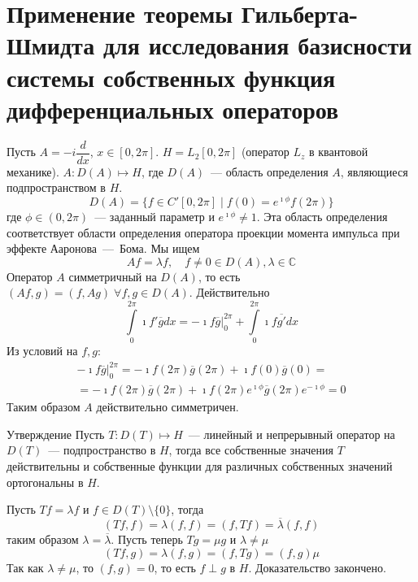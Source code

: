 \documentclass[14pt]{extarticle}
\begin{document}
\section*{Применение теоремы Гильберта-Шмидта для исследования базисности
системы собственных функция дифференциальных операторов}
\begin{Prim}
    Пусть $A = -i\dfrac{d}{dx}$, $x \in [0, 2\pi]$.
    $H = L_2[0, 2\pi]$ (оператор $L_z$ в квантовой механике).
    $A : D(A) \mapsto H$, где $D(A)$~--- область определения $A$, являющиеся
    подпространством в $H$.
    $$
    D(A) = \{f \in C'[0,2\pi] \mid f(0) = e^{\imath \phi}f(2\pi)\}
    $$
    где $\phi \in (0, 2\pi)$~--- заданный параметр и $e^{\imath \phi} \neq 1$.
    Эта область определения соответствует области определения оператора проекции
    момента импульса при эффекте Ааронова~---~Бома.
    Мы ищем
    $$
    Af = \lambda f,\quad f \neq 0\in D(A), \lambda \in \mathbb C
    $$
    Оператор $A$ симметричный на $D(A)$, то есть $(Af, g) = (f, Ag)\;\forall f,g \in D(A)$.
    Действительно
    $$
    \int\limits_{0}^{2\pi}\imath f' \overline{g} dx = \left. -\imath f \overline{g}\right|_{0}^{2\pi} +
    \int\limits_{0}^{2\pi}\imath f \overline{g'}dx
    $$
    Из условий на $f, g$:
    \begin{multline*}
        \left. -\imath f \overline{g}\right|_{0}^{2\pi} = -\imath f(2\pi)\overline{g}(2\pi) + 
        \imath f(0)\overline{g}(0) =\\=  -\imath f(2\pi)\overline{g}(2\pi) + 
        \imath f(2\pi)e^{\imath \phi}\overline{g}(2\pi)e^{-\imath \phi} = 0
    \end{multline*}
    Таким образом $A$ действительно симметричен.
    \begin{MathCl}{Утверждение}
        Пусть $T : D(T) \mapsto H$~--- линейный и непрерывный оператор на $D(T)$~---
        подпространство в $H$, тогда все собственные значения $T$ действительны и
        собственные функции для различных собственных значений ортогональны в $H$.
    \end{MathCl}
    \begin{Proof}
        Пусть $Tf = \lambda f$ и $f \in D(T) \setminus \{0\}$, тогда
        $$
        (Tf, f) = \lambda(f, f) = (f, Tf) = \overline{\lambda} (f, f)
        $$
        таким образом $\lambda = \overline{\lambda}$.
        Пусть теперь $Tg = \mu g$ и $\lambda \neq \mu$
        $$
        (Tf, g) = \lambda(f, g) = (f, Tg) = (f, g) \mu
        $$
        Так как $\lambda \neq \mu$, то $(f, g) = 0$, то есть $f \perp g$ в $H$.
        Доказательство закончено.
    \end{Proof}


\end{Prim}
\end{document}
